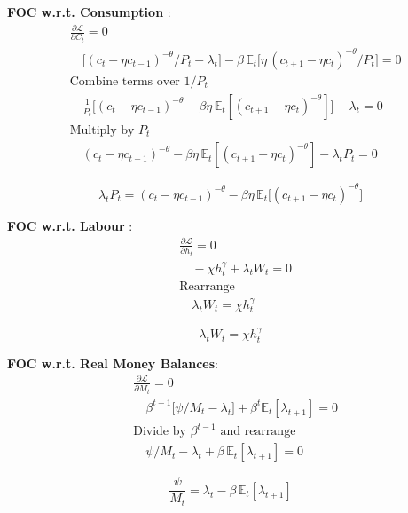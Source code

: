 \documentclass[11pt,preprint]{elsarticle}
\numberwithin{equation}{section}
\numberwithin{figure}{section}
\numberwithin{table}{section}
\begin{document}
\textbf{FOC w.r.t. Consumption} : \begin{align*}
  & \frac{\partial \mathcal{L}}{\partial C_t} = 0 \\
  & \quad \bigl[(c_t-\eta c_{t-1})^{-\theta}/P_t - \lambda_t\bigr]
    - \beta\,\mathbb{E}_t\bigl[\eta\,(c_{t+1}-\eta c_t)^{-\theta}/P_t\bigr] = 0 \\[6pt]
  & \text{Combine terms over }1/P_t \\
  & \quad \frac{1}{P_t}\bigl[(c_t-\eta c_{t-1})^{-\theta} - \beta\eta\,\mathbb{E}_t[(c_{t+1}-\eta c_t)^{-\theta}]\bigr] - \lambda_t = 0 \\[6pt]
  & \text{Multiply by }P_t \\
  & \quad (c_t-\eta c_{t-1})^{-\theta} - \beta\eta\,\mathbb{E}_t[(c_{t+1}-\eta c_t)^{-\theta}] - \lambda_t P_t = 0
\end{align*}

\begin{equation}\label{foc_C}
\boxed{
  \lambda_t P_t = (c_t-\eta c_{t-1})^{-\theta} - \beta\eta\,\mathbb{E}_t\bigl[(c_{t+1}-\eta c_t)^{-\theta}\bigr]
}
\end{equation}

\textbf{FOC w.r.t. Labour} : \begin{align*}
  & \frac{\partial \mathcal{L}}{\partial h_t} = 0 \\
  & \quad -\chi h_t^{\gamma} + \lambda_t W_t = 0 \\[6pt]
  & \text{Rearrange} \\
  & \quad \lambda_t W_t = \chi h_t^{\gamma}
\end{align*}

\begin{equation}\label{foc_h}
\boxed{\lambda_t W_t = \chi h_t^{\gamma}}
\end{equation}

\textbf{FOC w.r.t. Real Money Balances}: \begin{align*}
  & \frac{\partial \mathcal{L}}{\partial M_t} = 0 \\
  & \quad \beta^{t-1}\bigl[\psi/M_t - \lambda_t\bigr] + \beta^t\mathbb{E}_t[\lambda_{t+1}] = 0 \\[6pt]
  & \text{Divide by }\beta^{t-1}\text{ and rearrange} \\
  & \quad \psi/M_t - \lambda_t + \beta\,\mathbb{E}_t[\lambda_{t+1}] = 0
\end{align*}

\begin{equation}\label{foc_M}
\boxed{\frac{\psi}{M_t} = \lambda_t - \beta\,\mathbb{E}_t[\lambda_{t+1}]}
\end{equation}
\end{document}
